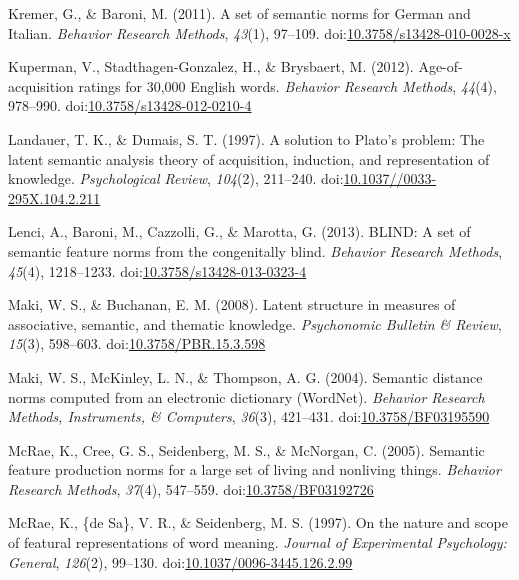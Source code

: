 \documentclass[english,man]{apa6}
\theoremstyle{definition}
\theoremstyle{definition}
\theoremstyle{definition}
\theoremstyle{remark}
\begin{document}
\hypertarget{ref-Kremer2011a}{}
Kremer, G., \& Baroni, M. (2011). A set of semantic norms for German and
Italian. \emph{Behavior Research Methods}, \emph{43}(1), 97--109.
doi:\href{https://doi.org/10.3758/s13428-010-0028-x}{10.3758/s13428-010-0028-x}

\hypertarget{ref-Kuperman2012}{}
Kuperman, V., Stadthagen-Gonzalez, H., \& Brysbaert, M. (2012).
Age-of-acquisition ratings for 30,000 English words. \emph{Behavior
Research Methods}, \emph{44}(4), 978--990.
doi:\href{https://doi.org/10.3758/s13428-012-0210-4}{10.3758/s13428-012-0210-4}

\hypertarget{ref-Landauer1997}{}
Landauer, T. K., \& Dumais, S. T. (1997). A solution to Plato's problem:
The latent semantic analysis theory of acquisition, induction, and
representation of knowledge. \emph{Psychological Review}, \emph{104}(2),
211--240.
doi:\href{https://doi.org/10.1037//0033-295X.104.2.211}{10.1037//0033-295X.104.2.211}

\hypertarget{ref-Lenci2013}{}
Lenci, A., Baroni, M., Cazzolli, G., \& Marotta, G. (2013). BLIND: A set
of semantic feature norms from the congenitally blind. \emph{Behavior
Research Methods}, \emph{45}(4), 1218--1233.
doi:\href{https://doi.org/10.3758/s13428-013-0323-4}{10.3758/s13428-013-0323-4}

\hypertarget{ref-Maki2008}{}
Maki, W. S., \& Buchanan, E. M. (2008). Latent structure in measures of
associative, semantic, and thematic knowledge. \emph{Psychonomic
Bulletin \& Review}, \emph{15}(3), 598--603.
doi:\href{https://doi.org/10.3758/PBR.15.3.598}{10.3758/PBR.15.3.598}

\hypertarget{ref-Maki2004}{}
Maki, W. S., McKinley, L. N., \& Thompson, A. G. (2004). Semantic
distance norms computed from an electronic dictionary (WordNet).
\emph{Behavior Research Methods, Instruments, \& Computers},
\emph{36}(3), 421--431.
doi:\href{https://doi.org/10.3758/BF03195590}{10.3758/BF03195590}

\hypertarget{ref-McRae2005}{}
McRae, K., Cree, G. S., Seidenberg, M. S., \& McNorgan, C. (2005).
Semantic feature production norms for a large set of living and
nonliving things. \emph{Behavior Research Methods}, \emph{37}(4),
547--559.
doi:\href{https://doi.org/10.3758/BF03192726}{10.3758/BF03192726}

\hypertarget{ref-McRae1997}{}
McRae, K., \{de Sa\}, V. R., \& Seidenberg, M. S. (1997). On the nature
and scope of featural representations of word meaning. \emph{Journal of
Experimental Psychology: General}, \emph{126}(2), 99--130.
doi:\href{https://doi.org/10.1037/0096-3445.126.2.99}{10.1037/0096-3445.126.2.99}
\end{document}
